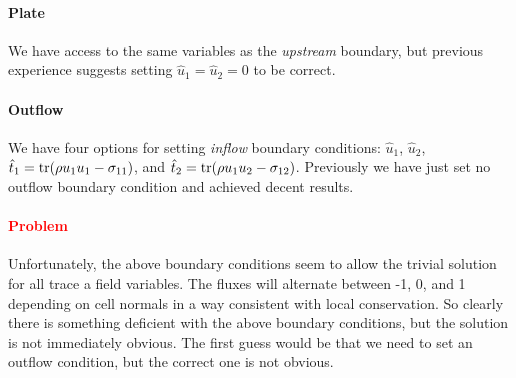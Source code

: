 \documentclass{article}
\begin{document}
\paragraph*{Plate}
We have access to the same variables as the \emph{upstream} boundary, but previous experience suggests setting $\hat u_1=\hat u_2=0$ to be correct.

\paragraph*{Outflow}
We have four options for setting \emph{inflow} boundary conditions: $\hat u_1$, $\hat u_2$,
$\hat t_1=\operatorname*{tr}(\rho u_1u_1-\sigma_{11})$, and $\hat t_2=\operatorname*{tr}(\rho u_1u_2-\sigma_{12})$.
Previously we have just set no outflow boundary condition and achieved decent results.

\paragraph*{\textcolor{red}{Problem}}
Unfortunately, the above boundary conditions seem to allow the trivial solution for all trace a field variables. 
The fluxes will alternate between -1, 0, and 1 depending on cell normals in a way consistent with local conservation. 
So clearly there is something deficient with the above boundary conditions, but the solution is not immediately obvious.
The first guess would be that we need to set an outflow condition, but the correct one is not obvious.

\end{document}

